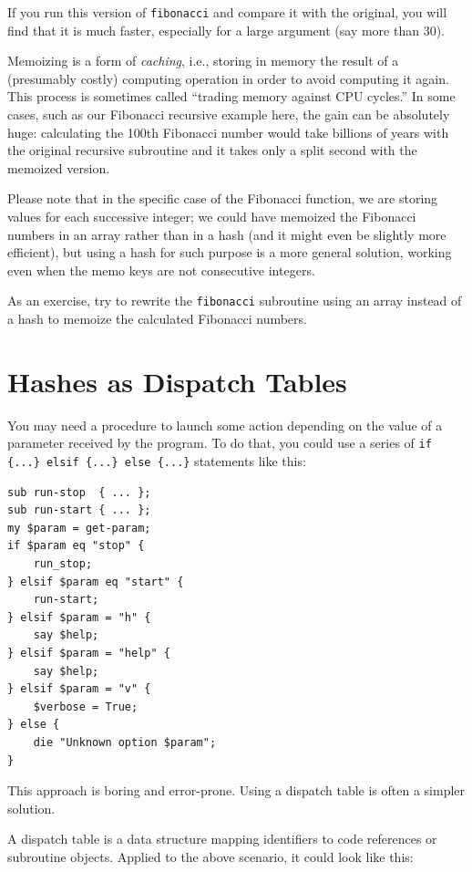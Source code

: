If you run this version of {\tt fibonacci} and compare it with
the original, you will find that it is much faster, especially 
for a large argument (say more than 30).

Memoizing is a form of \emph{caching}, i.e., storing in memory 
the result of a (presumably costly) computing operation in 
order to avoid computing it again. This process is 
sometimes called ``trading memory against CPU cycles.''  In 
some cases, such as our Fibonacci recursive example here, the gain 
can be absolutely huge: calculating the 100th Fibonacci 
number would take billions of years with the original recursive 
subroutine and it takes only a split second with the memoized 
version.

Please note that in the specific case of the Fibonacci function, 
we are storing values for each successive integer; we could 
have memoized the Fibonacci numbers in an array rather than 
in a hash (and it might even be slightly more efficient), but 
using a hash for such purpose is a more general solution, 
working even when the memo keys are not consecutive integers.

As an exercise, try to rewrite the {\tt fibonacci} subroutine 
using an array instead of a hash to memoize the calculated 
Fibonacci numbers.


\section{Hashes as Dispatch Tables}
\label{dispatch}

You may 
need a procedure to launch some action depending on the 
value of a parameter received by the program. To do that, 
you could use a series of 
\verb'if {...} elsif {...} else {...}' 
statements like this:

\begin{verbatim}
sub run-stop  { ... };
sub run-start { ... };
my $param = get-param;
if $param eq "stop" {
    run_stop;
} elsif $param eq "start" {
    run-start;
} elsif $param = "h" {
    say $help;
} elsif $param = "help" {
    say $help;
} elsif $param = "v" {
    $verbose = True;
} else {
    die "Unknown option $param";
}
\end{verbatim}

This approach is boring and error-prone. Using a dispatch table 
is often a simpler solution.

A dispatch table is a data structure mapping identifiers to 
code references or subroutine objects. Applied to the 
above scenario, it could look like this:

